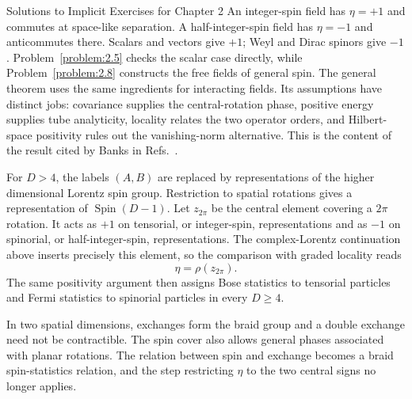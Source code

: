 \begin{bankssolutions}{Solutions to Implicit Exercises for Chapter 2}
An integer-spin field has $\eta=+1$ and commutes at space-like separation. A
half-integer-spin field has $\eta=-1$ and anticommutes there. Scalars and
vectors give $+1$; Weyl and Dirac spinors give $-1$. Problem~\ref{problem:2.5}
checks the scalar case directly, while Problem~\ref{problem:2.8} constructs the
free fields of general spin. The general theorem uses the same ingredients for
interacting fields. Its assumptions have distinct jobs: covariance supplies
the central-rotation phase, positive energy supplies tube analyticity, locality
relates the two operator orders, and Hilbert-space positivity rules out the
vanishing-norm alternative. This is the content of the result cited by Banks in
Refs.~\cite{banks-ref-6,banks-ref-7,banks-ref-8}.

For $D>4$, the labels $(A,B)$ are replaced by representations of the higher
dimensional Lorentz spin group. Restriction to spatial rotations gives a
representation of $\operatorname{Spin}(D-1)$. Let $z_{2\pi}$ be the central
element covering a $2\pi$ rotation. It acts as $+1$ on tensorial, or
integer-spin, representations and as $-1$ on spinorial, or half-integer-spin,
representations. The complex-Lorentz continuation above inserts precisely this
element, so the comparison with graded locality reads
\[
  \eta=\rho(z_{2\pi}).
\]
The same positivity argument then assigns Bose statistics to tensorial
particles and Fermi statistics to spinorial particles in every $D\geq4$.

In two spatial dimensions, exchanges form the braid group and a double exchange
need not be contractible. The spin cover also allows general phases associated
with planar rotations. The relation between spin and exchange becomes a braid
spin-statistics relation, and the step restricting $\eta$ to the two central
signs no longer applies.

\end{bankssolutions}
